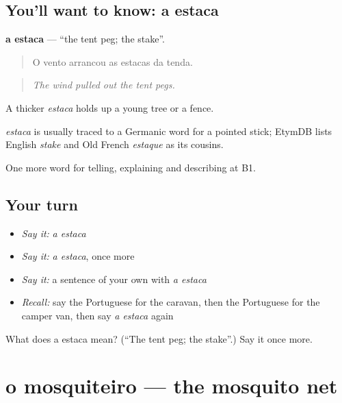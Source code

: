 \subsection*{You'll want to know: a estaca}
\textbf{a estaca} — \textquotedblleft{}the tent peg; the stake\textquotedblright{}.

\begin{quote}
O vento arrancou as estacas da tenda.
\end{quote}

\begin{quote}
\emph{The wind pulled out the tent pegs.}
\end{quote}

A thicker \emph{estaca} holds up a young tree or a fence.

\begin{cousinweb}
\emph{estaca} is usually traced to a Germanic word for a pointed stick; EtymDB lists English \emph{stake} and Old French \emph{estaque} as its cousins.
\end{cousinweb}

\begin{grammarlens}[title={What you've built}]
One more word for telling, explaining and describing at B1.
\end{grammarlens}

\subsection*{Your turn}
\begin{itemize}
\raggedright
  \item \emph{Say it:} \emph{a estaca}
  \item \emph{Say it:} \emph{a estaca}, once more
  \item \emph{Say it:} a sentence of your own with \emph{a estaca}
  \item \emph{Recall:} say the Portuguese for the caravan, then the Portuguese for the camper van, then say \emph{a estaca} again
\end{itemize}

\begin{tcolorbox}[breakable,colback=teal!4,colframe=teal!35!black,title={Before you move on}]
What does a estaca mean? (\textquotedblleft{}The tent peg; the stake\textquotedblright{}.) Say it once more.
\end{tcolorbox}
\section[o mosquiteiro]{o mosquiteiro — the mosquito net}

